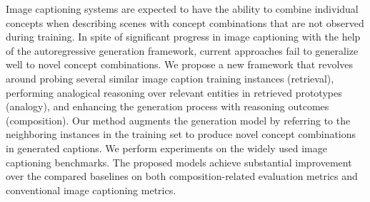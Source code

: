 Image captioning systems are expected to have the ability to combine individual concepts when describing scenes with concept combinations that are not observed during training. In spite of significant progress in image captioning with the help of the autoregressive generation framework, current approaches fail to generalize well to novel concept combinations. We propose a new framework that revolves around probing several similar image caption training instances (retrieval), performing analogical reasoning over relevant entities in retrieved prototypes (analogy), and enhancing the generation process with reasoning outcomes (composition). Our method augments the generation model by referring to the neighboring instances in the training set to produce novel concept combinations in generated captions. We perform experiments on the widely used image captioning benchmarks. The proposed models achieve substantial improvement over the compared baselines on both composition-related evaluation metrics and conventional image captioning metrics.
